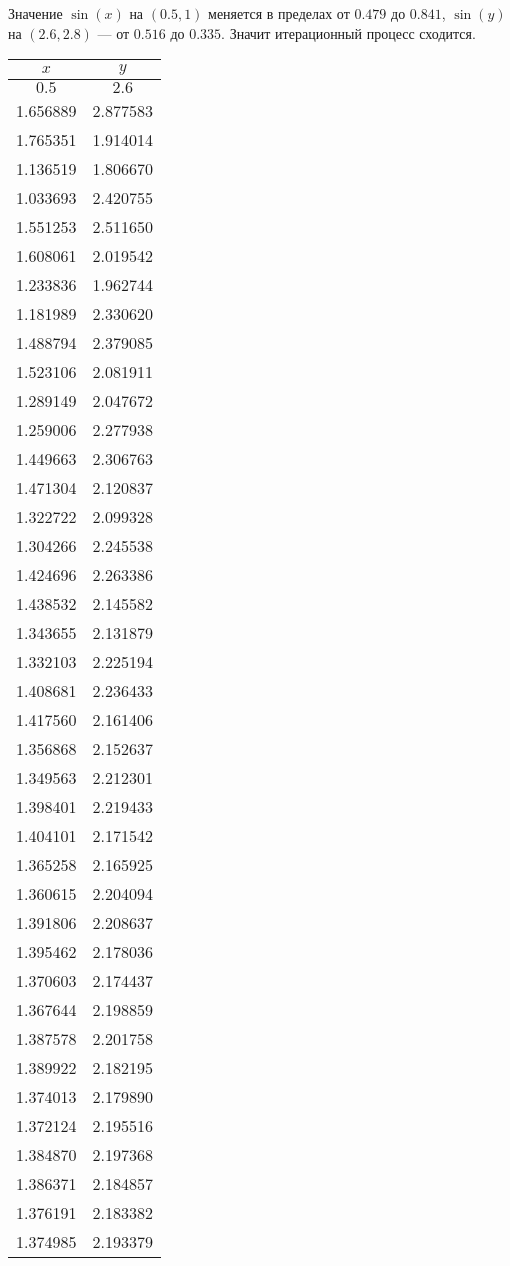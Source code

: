 Значение \(\sin(x)\) на \((0.5, 1)\) меняется в пределах от \(0.479\) до $0.841$,
\(\sin(y)\) на $(2.6, 2.8)$ --- от $0.516$ до $0.335$.
Значит итерационный процесс сходится.

\begin{table}[H]
  \centering
	\begin{tabular}{|c | c|}
		\hline
		$x$      & $y$      \\
		\hline
		$0.5$    & $2.6$    \\
		1.656889 & 2.877583 \\
		1.765351 & 1.914014 \\
		1.136519 & 1.806670 \\
		1.033693 & 2.420755 \\
		1.551253 & 2.511650 \\
		1.608061 & 2.019542 \\
		1.233836 & 1.962744 \\
		1.181989 & 2.330620 \\
		1.488794 & 2.379085 \\
		1.523106 & 2.081911 \\
		1.289149 & 2.047672 \\
		1.259006 & 2.277938 \\
		1.449663 & 2.306763 \\
		1.471304 & 2.120837 \\
		1.322722 & 2.099328 \\
		1.304266 & 2.245538 \\
		1.424696 & 2.263386 \\
		1.438532 & 2.145582 \\
		1.343655 & 2.131879 \\
		1.332103 & 2.225194 \\
		1.408681 & 2.236433 \\
		1.417560 & 2.161406 \\
		1.356868 & 2.152637 \\
		1.349563 & 2.212301 \\
		1.398401 & 2.219433 \\
		1.404101 & 2.171542 \\
		1.365258 & 2.165925 \\
		1.360615 & 2.204094 \\
		1.391806 & 2.208637 \\
		1.395462 & 2.178036 \\
		1.370603 & 2.174437 \\
		1.367644 & 2.198859 \\
		1.387578 & 2.201758 \\
		1.389922 & 2.182195 \\
		1.374013 & 2.179890 \\
		1.372124 & 2.195516 \\
		1.384870 & 2.197368 \\
		1.386371 & 2.184857 \\
		1.376191 & 2.183382 \\
		1.374985 & 2.193379 \\
		\hline
	\end{tabular}
\end{table}
